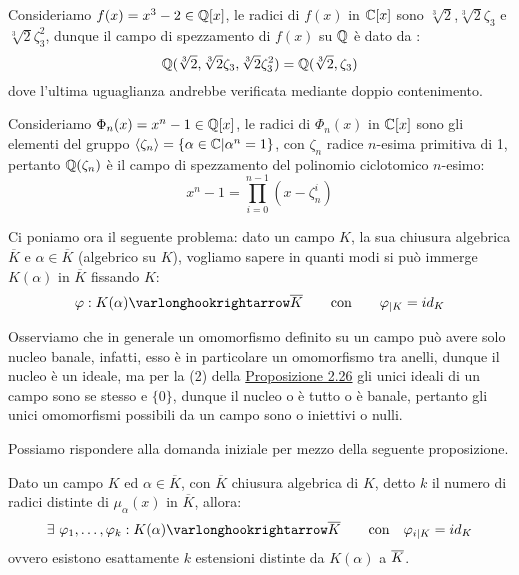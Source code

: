 \documentclass[11pt]{scrartcl}
\begin{document}
\begin{example}
    Consideriamo $f(x) = x^3 - 2 \in \mathbb Q[x]$, le radici di $f(x)$ in $\mathbb C[x]$ sono $\sqrt[3]{2}$,$\sqrt[3]{2}\zeta_3$ e $\sqrt[3]{2}\zeta_3^2$, dunque il campo di spezzamento di $f(x)$ su $\mathbb Q$ è dato da :
    \[ \mathbb Q(\sqrt[3]{2},\sqrt[3]{2}\zeta_3,\sqrt[3]{2}\zeta_3^2) = \mathbb Q(\sqrt[3]{2},\zeta_3)
        \]
    dove l'ultima uguaglianza andrebbe verificata mediante doppio contenimento.
\end{example}

\begin{example}
    Consideriamo $\Phi_n(x) = x^n - 1 \in \mathbb Q[x]$, le radici di $\Phi_n(x)$ in $\mathbb C[x]$ sono gli elementi del gruppo $\left<\zeta_n\right> = \{\alpha \in \mathbb C | \alpha^n = 1\}$, con $\zeta_n$ radice $n$-esima primitiva di 1,
    pertanto $\mathbb Q(\zeta_n)$ è il campo di spezzamento del polinomio ciclotomico $n$-esimo:
    \[ x^n - 1 = \prod_{i = 0}^{n-1} (x - \zeta_n^i)
        \]
\end{example}


Ci poniamo ora il seguente problema: dato un campo $K$, la sua chiusura algebrica $\overline K$ e $\alpha \in \overline K$ (algebrico su $K$), vogliamo sapere in quanti modi si può immerge $K(\alpha)$ in $\overline K$ fissando $K$:
\[ \varphi : K(\alpha) \varlonghookrightarrow \overline K \qquad \text{con} \qquad \varphi_{|K} = id_K
    \]

\begin{remark}
    \label{3.32}
Osserviamo che in generale un omomorfismo definito su un campo può avere solo nucleo banale, infatti, esso è in particolare un omomorfismo tra anelli, dunque il nucleo è un ideale, ma per la (2) della \hyperref[2.26]{Proposizione 2.26} gli unici ideali di un campo 
sono se stesso e $\{0\}$, dunque il nucleo o è tutto o è banale, pertanto gli unici omomorfismi possibili da un campo sono o iniettivi o nulli.    
\end{remark}

Possiamo rispondere alla domanda iniziale per mezzo della seguente proposizione.

\begin{proposition}
    \label{3.33}
    Dato un campo $K$ ed $\alpha \in \overline K$, con $\overline K$ chiusura algebrica di $K$, detto $k$ il numero di radici distinte di $\mu_\alpha(x)$ in $\overline K$, allora:
    \[ \exists ~ \varphi_1,\ldots,\varphi_k : K(\alpha) \varlonghookrightarrow \overline K \qquad \text{con} \quad \varphi_{i|K} = id_K
        \]
    ovvero esistono esattamente $k$ estensioni distinte da $K(\alpha)$ a $\overline K$.
\end{proposition}
\end{document}
